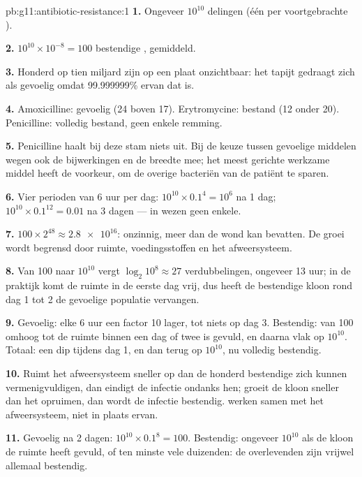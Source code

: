 \begin{solution}{pb:g11:antibiotic-resistance:1}
\textbf{1.} Ongeveer $10^{10}$ delingen (één per voortgebrachte ).

\textbf{2.} $10^{10} \times 10^{-8} = 100$ bestendige , gemiddeld.

\textbf{3.} Honderd  op tien miljard zijn op een plaat onzichtbaar:
het tapijt gedraagt zich als gevoelig omdat 99.999999\% ervan dat is.

\textbf{4.} Amoxicilline: gevoelig (24 boven 17). Erytromycine: bestand
(12 onder 20). Penicilline: volledig bestand, geen enkele remming.

\textbf{5.} Penicilline haalt bij deze stam niets uit. Bij de keuze tussen
gevoelige middelen wegen ook de bijwerkingen en de breedte mee; het meest
gerichte werkzame middel heeft de voorkeur, om de overige bacteriën van
de patiënt te sparen.

\textbf{6.} Vier perioden van 6 uur per dag: $10^{10} \times 0.1^4 =
10^6$ na 1 dag; $10^{10} \times 0.1^{12} = 0.01$ na 3 dagen --- in wezen
geen enkele.

\textbf{7.} $100 \times 2^{48} \approx \num{2.8e16}$: onzinnig, meer dan
de wond kan bevatten. De groei wordt begrensd door ruimte,
voedingsstoffen en het afweersysteem.

\textbf{8.} Van 100  naar $10^{10}$ vergt $\log_2 10^8 \approx 27$
verdubbelingen, ongeveer 13 uur; in de praktijk komt de ruimte in de
eerste dag vrij, dus heeft de bestendige kloon rond dag 1 tot 2 de
gevoelige populatie vervangen.

\textbf{9.} Gevoelig: elke 6 uur een factor 10 lager, tot niets op dag 3.
Bestendig: van 100 omhoog tot de ruimte binnen een dag of twee is gevuld,
en daarna vlak op $10^{10}$. Totaal: een dip tijdens dag 1, en dan terug
op $10^{10}$, nu volledig bestendig.

\textbf{10.} Ruimt het afweersysteem  sneller op dan de honderd
bestendige zich kunnen vermenigvuldigen, dan eindigt de infectie ondanks
hen; groeit de kloon sneller dan het opruimen, dan wordt de infectie
bestendig.  werken samen met het afweersysteem, niet in plaats
ervan.

\textbf{11.} Gevoelig na 2 dagen: $10^{10} \times 0.1^8 = 100$. Bestendig:
ongeveer $10^{10}$ als de kloon de ruimte heeft gevuld, of ten minste vele
duizenden: de overlevenden zijn vrijwel allemaal bestendig.


\end{solution}
